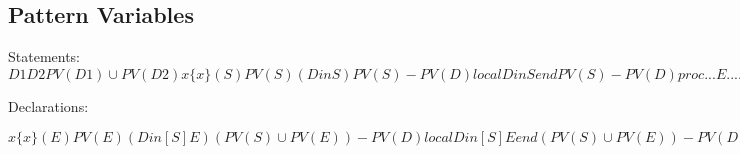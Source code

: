 \documentclass[a4paper]{memoir}
\begin{document}
\begin{appendices} 

\chapter{Pattern Variables}\label{appendix:patternvariables}
Statements:
$
D1 D2                        PV(D1) \cup PV(D2)
x                            \{x\}
(S)                          PV(S)
(D in S)                     PV(S) - PV(D)
local D in S end             PV(S) - PV(D)
proc ... {E ...} ... end     PV(E)
fun ... {E ...} ... end      PV(E)
class E ... end              PV(E)
functor E ... end            PV(E)
E = ...                      PV(E)
otherwise                    \emptyset
$


Declarations:

$
x                                         \{x\}
(E)                                       PV(E)
(D in [ S ] E)                            (PV(S) \cup PV(E)) - PV(D)
local D in [ S ] E end                    (PV(S) \cup PV(E)) - PV(D)
E1 = E2                                   PV(E1) \cup PV(E2)
[E1 ... En]                               PV(E1) \cup ... \cup PV(En)
E1|E2                                     PV(E1) \cup PV(E2)
E1\#...\#En                                 PV(E1) \cup ... \cup PV(En)
il([ f1: ] E1 ... [ fn: ] En [ ... ])     PV(E1) \cup ... \cup PV(En)
otherwise                                 \emptyset
$


\end{appendices}
\end{document}
